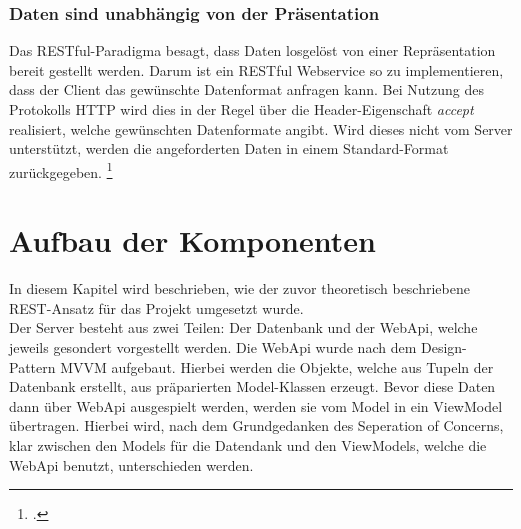 \subsubsection*{Daten sind unabhängig von der Präsentation}
Das RESTful-Paradigma besagt, dass Daten losgelöst von einer Repräsentation bereit gestellt werden. Darum ist ein RESTful Webservice so zu implementieren, dass der Client das gewünschte Datenformat anfragen kann. Bei Nutzung des Protokolls HTTP wird dies in der Regel über die Header-Eigenschaft \textit{accept} realisiert, welche gewünschten Datenformate angibt. Wird dieses nicht vom Server unterstützt, werden die angeforderten Daten in einem Standard-Format zurückgegeben. \footcite[S. 26ff.]{REST-und-HTTP}
\section{Aufbau der Komponenten}
\label{sec:aufbau-Komponenten}
In diesem Kapitel wird beschrieben, wie der zuvor theoretisch beschriebene REST-Ansatz für das Projekt umgesetzt wurde. \\Der Server besteht aus zwei Teilen: Der Datenbank und der WebApi, welche jeweils gesondert vorgestellt werden. 
Die WebApi wurde nach dem Design-Pattern \ac{MVVM} aufgebaut. Hierbei werden die Objekte, welche aus Tupeln der Datenbank erstellt, aus präparierten Model-Klassen erzeugt. Bevor diese Daten dann über WebApi ausgespielt werden, werden sie vom Model in ein ViewModel übertragen. Hierbei wird, nach dem Grundgedanken des \ac{Seperation of Concerns}, klar zwischen den Models für die Datendank und den ViewModels, welche die WebApi benutzt, unterschieden werden. 
